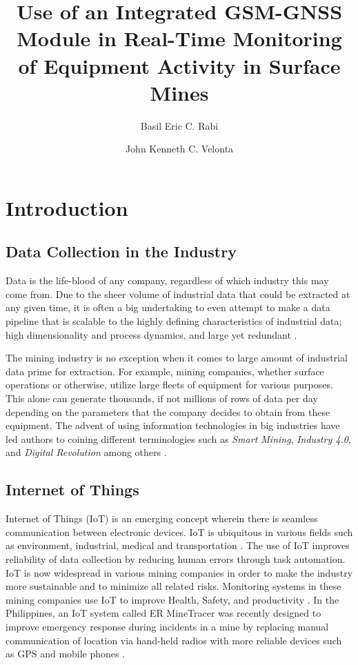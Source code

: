 \documentclass{article}
\title{Use of an Integrated GSM-GNSS Module in Real-Time Monitoring of Equipment Activity in Surface Mines}
\author{Basil Eric C. Rabi \and John Kenneth C. Velonta}
\begin{document}
\maketitle

\section{Introduction}

\subsection{Data Collection in the Industry}

Data is the life-blood of any company, regardless of which industry this may come from.
Due to the sheer volume of industrial data that could be extracted at any given time, it is often a big undertaking to even attempt to make a data pipeline that is scalable to the highly defining characteristics of industrial data; high dimensionality and process dynamics, and large yet redundant \cite{Urhan}.

The mining industry is no exception when it comes to large amount of industrial data prime for extraction.
For example, mining companies, whether surface operations or otherwise, utilize large fleets of equipment for various purposes.
This alone can generate thousands, if not millions of rows of data per day depending on the parameters that the company decides to obtain from these equipment.
The advent of using information technologies in big industries have led authors to coining different terminologies such as \textit{Smart Mining}, \textit{Industry 4.0}, and \textit{Digital Revolution} among others \cite{SmartMining}.

\subsection{Internet of Things}

Internet of Things (IoT) is an emerging concept wherein there is seamless communication between electronic devices.
IoT is ubiquitous in various fields such as environment, industrial, medical and transportation \cite{IoT}.
The use of IoT improves reliability of data collection by reducing human errors through task automation.
IoT is now widespread in various mining companies in order to make the industry more sustainable and to minimize all related risks.
Monitoring systems in these mining companies use IoT to improve Health, Safety, and productivity \cite{IoTinMining}.
In the Philippines, an IoT system called ER MineTracer was recently designed to improve emergency response during incidents in a mine by replacing manual communication of location via hand-held radios with more reliable devices such as GPS and mobile phones \cite{ERMineTracer}.
\end{document}
